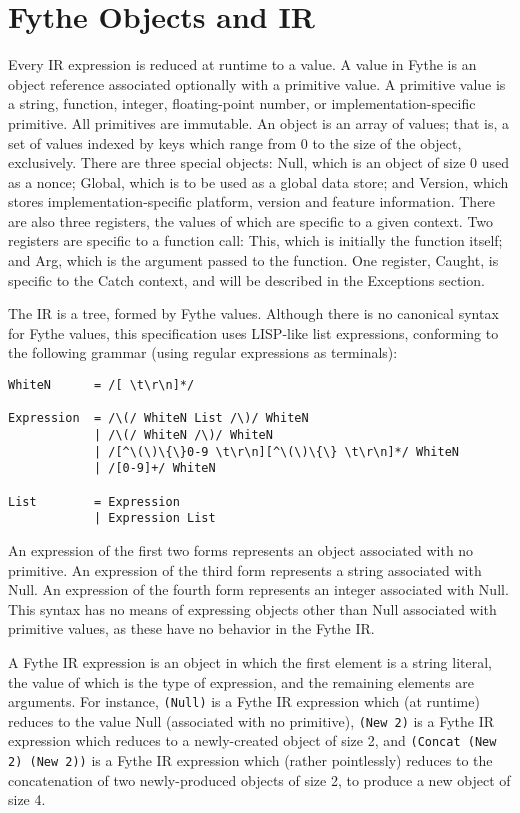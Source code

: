 \chapter{Fythe Objects and IR}

Every IR expression is reduced at runtime to a value. A value in Fythe is an
object reference associated optionally with a primitive value. A primitive
value is a string, function, integer, floating-point number, or
implementation-specific primitive. All primitives are immutable. An object is
an array of values; that is, a set of values indexed by keys which range from 0
to the size of the object, exclusively. There are three special objects: Null,
which is an object of size 0 used as a nonce; Global, which is to be used as a
global data store; and Version, which stores implementation-specific platform,
version and feature information. There are also three registers, the values of
which are specific to a given context. Two registers are specific to a function
call: This, which is initially the function itself; and Arg, which is the
argument passed to the function. One register, Caught, is specific to the Catch
context, and will be described in the Exceptions section. %

The IR is a tree, formed by Fythe values. Although there is no canonical syntax
for Fythe values, this specification uses LISP-like list expressions,
conforming to the following grammar (using regular expressions as terminals):

\begin{verbatim}
WhiteN      = /[ \t\r\n]*/

Expression  = /\(/ WhiteN List /\)/ WhiteN
            | /\(/ WhiteN /\)/ WhiteN
            | /[^\(\)\{\}0-9 \t\r\n][^\(\)\{\} \t\r\n]*/ WhiteN
            | /[0-9]+/ WhiteN

List        = Expression
            | Expression List
\end{verbatim}

An expression of the first two forms represents an object associated with no
primitive. An expression of the third form represents a string associated with
Null. An expression of the fourth form represents an integer associated with
Null. This syntax has no means of expressing objects other than Null associated
with primitive values, as these have no behavior in the Fythe IR.

A Fythe IR expression is an object in which the first element is a string
literal, the value of which is the type of expression, and the remaining
elements are arguments. For instance,
\texttt{(Null)}
is a Fythe IR expression which (at runtime) reduces to the value Null
(associated with no primitive),
\texttt{(New 2)}
is a Fythe IR expression which reduces to a newly-created object of size 2, and
\texttt{(Concat (New 2) (New 2))}
is a Fythe IR expression which (rather pointlessly) reduces to the
concatenation of two newly-produced objects of size 2, to produce a new object
of size 4.

